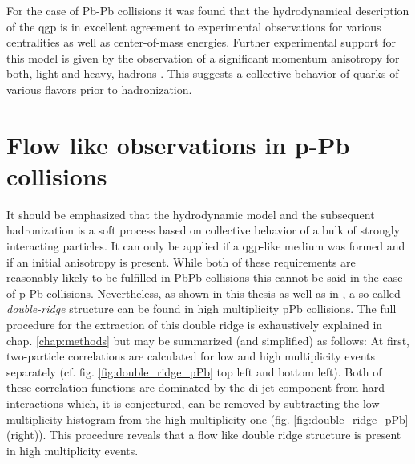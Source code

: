 For the case of Pb-Pb collisions it was found that the hydrodynamical description of the \gls{qgp} is in excellent agreement to experimental observations for various centralities as well as center-of-mass energies\cite{Manly2006}. Further experimental support for this model is given by the observation of a significant momentum anisotropy for both, light and heavy, hadrons \cite{dEnterria2007}. This suggests a collective behavior of quarks of various flavors prior to hadronization. 




\section{Flow like observations in p-Pb collisions}
\label{sec:flow-like-pPb}

It should be emphasized that the hydrodynamic model and the subsequent hadronization is a soft process based on collective behavior of a bulk of strongly interacting particles. It can only be applied if a \gls{qgp}-like medium was formed and if an initial anisotropy is present. While both of these requirements are reasonably likely to be fulfilled in PbPb collisions this cannot be said in the case of p-Pb collisions. Nevertheless, as shown in this thesis as well as in \cite{Abelev2012}, a so-called  \emph{double-ridge} structure can be found in high multiplicity \gls{pPb} collisions. The full procedure for the extraction of this double ridge is exhaustively explained in chap. \ref{chap:methods} but may be summarized (and simplified) as follows: At first, two-particle correlations are calculated for low and high multiplicity events separately (cf. fig. \ref{fig:double_ridge_pPb} top left and bottom left). Both of these correlation functions are dominated by the di-jet component from hard interactions which, it is conjectured, can be removed by subtracting the low multiplicity histogram from the high multiplicity one (fig. \ref{fig:double_ridge_pPb} (right)). This procedure reveals that a flow like double ridge structure is present in high multiplicity events. 

